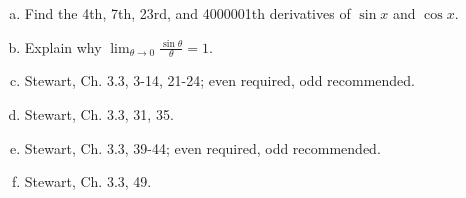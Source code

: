 \documentclass[12pt]{article}
\begin{document}
\begin{enumerate}[(a)]
\item
Find the 4th, 7th, 23rd, and 4000001th derivatives of $\sin x$ and $\cos x$.

\item
Explain why $\lim_{\theta \rightarrow 0} \frac{\sin \theta}{\theta} = 1$.

\item
Stewart, Ch. 3.3, 3-14, 21-24; even required, odd recommended.

\item
Stewart, Ch. 3.3, 31, 35.

\item
Stewart, Ch. 3.3, 39-44; even required, odd recommended.

\item
Stewart, Ch. 3.3, 49.

\end{enumerate}
\end{document}
